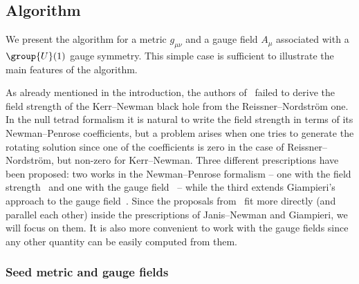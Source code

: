 \subsection{Algorithm}
\label{sec:algo:algorithm}


We present the algorithm for a metric $g_{\mu\nu}$ and a gauge field $A_\mu$ associated with a $\group{U}(1)$ gauge symmetry.
This simple case is sufficient to illustrate the main features of the algorithm.

As already mentioned in the introduction, the authors of~\cite{Newman:1965:MetricRotatingCharged} failed to derive the field strength of the Kerr--Newman black hole from the Reissner--Nordström one.
In the null tetrad formalism it is natural to write the field strength in terms of its Newman--Penrose coefficients, but a problem arises when one tries to generate the rotating solution since one of the coefficients is zero in the case of Reissner--Nordström, but non-zero for Kerr--Newman.
Three different prescriptions have been proposed: two works in the Newman--Penrose formalism -- one with the field strength~\cite{Keane:2014:ExtensionNewmanJanisAlgorithm} and one with the gauge field~\cite{Erbin:2015:JanisNewmanAlgorithmSimplifications} -- while the third extends Giampieri's approach to the gauge field~\cite{Erbin:2015:JanisNewmanAlgorithmSimplifications}.
Since the proposals from~\cite{Erbin:2015:JanisNewmanAlgorithmSimplifications} fit more directly (and parallel each other) inside the prescriptions of Janis--Newman and Giampieri, we will focus on them.
It is also more convenient to work with the gauge fields since any other quantity can be easily computed from them.


\subsubsection{Seed metric and gauge fields}


